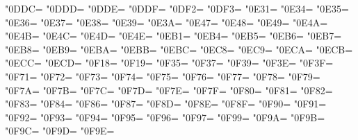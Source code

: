 \XeTeXcharclass"0DDC=\KclassCM
\XeTeXcharclass"0DDD=\KclassCM
\XeTeXcharclass"0DDE=\KclassCM
\XeTeXcharclass"0DDF=\KclassCM
\XeTeXcharclass"0DF2=\KclassCM
\XeTeXcharclass"0DF3=\KclassCM
\XeTeXcharclass"0E31=\KclassCM
\XeTeXcharclass"0E34=\KclassCM
\XeTeXcharclass"0E35=\KclassCM
\XeTeXcharclass"0E36=\KclassCM
\XeTeXcharclass"0E37=\KclassCM
\XeTeXcharclass"0E38=\KclassCM
\XeTeXcharclass"0E39=\KclassCM
\XeTeXcharclass"0E3A=\KclassCM
\XeTeXcharclass"0E47=\KclassCM
\XeTeXcharclass"0E48=\KclassCM
\XeTeXcharclass"0E49=\KclassCM
\XeTeXcharclass"0E4A=\KclassCM
\XeTeXcharclass"0E4B=\KclassCM
\XeTeXcharclass"0E4C=\KclassCM
\XeTeXcharclass"0E4D=\KclassCM
\XeTeXcharclass"0E4E=\KclassCM
\XeTeXcharclass"0EB1=\KclassCM
\XeTeXcharclass"0EB4=\KclassCM
\XeTeXcharclass"0EB5=\KclassCM
\XeTeXcharclass"0EB6=\KclassCM
\XeTeXcharclass"0EB7=\KclassCM
\XeTeXcharclass"0EB8=\KclassCM
\XeTeXcharclass"0EB9=\KclassCM
\XeTeXcharclass"0EBA=\KclassCM
\XeTeXcharclass"0EBB=\KclassCM
\XeTeXcharclass"0EBC=\KclassCM
\XeTeXcharclass"0EC8=\KclassCM
\XeTeXcharclass"0EC9=\KclassCM
\XeTeXcharclass"0ECA=\KclassCM
\XeTeXcharclass"0ECB=\KclassCM
\XeTeXcharclass"0ECC=\KclassCM
\XeTeXcharclass"0ECD=\KclassCM
\XeTeXcharclass"0F18=\KclassCM
\XeTeXcharclass"0F19=\KclassCM
\XeTeXcharclass"0F35=\KclassCM
\XeTeXcharclass"0F37=\KclassCM
\XeTeXcharclass"0F39=\KclassCM
\XeTeXcharclass"0F3E=\KclassCM
\XeTeXcharclass"0F3F=\KclassCM
\XeTeXcharclass"0F71=\KclassCM
\XeTeXcharclass"0F72=\KclassCM
\XeTeXcharclass"0F73=\KclassCM
\XeTeXcharclass"0F74=\KclassCM
\XeTeXcharclass"0F75=\KclassCM
\XeTeXcharclass"0F76=\KclassCM
\XeTeXcharclass"0F77=\KclassCM
\XeTeXcharclass"0F78=\KclassCM
\XeTeXcharclass"0F79=\KclassCM
\XeTeXcharclass"0F7A=\KclassCM
\XeTeXcharclass"0F7B=\KclassCM
\XeTeXcharclass"0F7C=\KclassCM
\XeTeXcharclass"0F7D=\KclassCM
\XeTeXcharclass"0F7E=\KclassCM
\XeTeXcharclass"0F7F=\KclassCM
\XeTeXcharclass"0F80=\KclassCM
\XeTeXcharclass"0F81=\KclassCM
\XeTeXcharclass"0F82=\KclassCM
\XeTeXcharclass"0F83=\KclassCM
\XeTeXcharclass"0F84=\KclassCM
\XeTeXcharclass"0F86=\KclassCM
\XeTeXcharclass"0F87=\KclassCM
\XeTeXcharclass"0F8D=\KclassCM
\XeTeXcharclass"0F8E=\KclassCM
\XeTeXcharclass"0F8F=\KclassCM
\XeTeXcharclass"0F90=\KclassCM
\XeTeXcharclass"0F91=\KclassCM
\XeTeXcharclass"0F92=\KclassCM
\XeTeXcharclass"0F93=\KclassCM
\XeTeXcharclass"0F94=\KclassCM
\XeTeXcharclass"0F95=\KclassCM
\XeTeXcharclass"0F96=\KclassCM
\XeTeXcharclass"0F97=\KclassCM
\XeTeXcharclass"0F99=\KclassCM
\XeTeXcharclass"0F9A=\KclassCM
\XeTeXcharclass"0F9B=\KclassCM
\XeTeXcharclass"0F9C=\KclassCM
\XeTeXcharclass"0F9D=\KclassCM
\XeTeXcharclass"0F9E=\KclassCM
